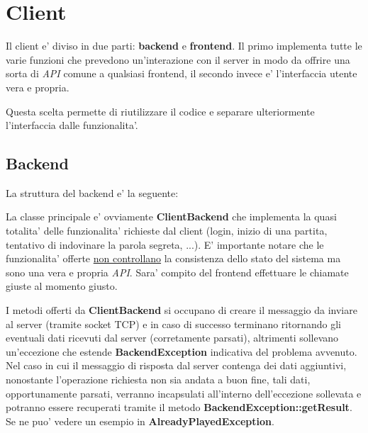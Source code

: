 \section{Client}

Il client e' diviso in due parti: \textbf{backend} e \textbf{frontend}. Il primo implementa tutte le varie funzioni che prevedono un'interazione con il server in modo da offrire una sorta di \emph{API} comune a qualsiasi frontend, il secondo invece e' l'interfaccia utente vera e propria.

Questa scelta permette di riutilizzare il codice e separare ulteriormente l'interfaccia dalle funzionalita'.

\subsection{Backend}

La struttura del backend e' la seguente:
\bigskip

\bigskip

La classe principale e' ovviamente \textbf{ClientBackend} che implementa la quasi totalita' delle funzionalita' richieste dal client (login, inizio di una partita, tentativo di indovinare la parola segreta, ...). E' importante notare che le funzionalita' offerte \underline{non controllano} la consistenza dello stato del sistema ma sono una vera e propria \emph{API}. Sara' compito del frontend effettuare le chiamate giuste al momento giusto.

I metodi offerti da \textbf{ClientBackend} si occupano di creare il messaggio da inviare al server (tramite socket TCP) e in caso di successo terminano ritornando gli eventuali dati ricevuti dal server (corretamente parsati), altrimenti sollevano un'eccezione che estende \textbf{BackendException} indicativa del problema avvenuto. Nel caso in cui il messaggio di risposta dal server contenga dei dati aggiuntivi, nonostante l'operazione richiesta non sia andata a buon fine, tali dati, opportunamente parsati, verranno incapsulati all'interno dell'eccezione sollevata e potranno essere recuperati tramite il metodo \textbf{BackendException::getResult}. Se ne puo' vedere un esempio in \textbf{AlreadyPlayedException}.

